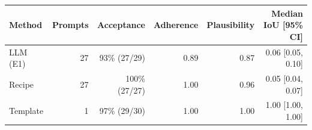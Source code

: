 \begin{tabular}{lrrrrr}
\toprule
Method & Prompts & Acceptance & Adherence & Plausibility & Median IoU [95\% CI] \\
\midrule
LLM (E1) & 27 & 93\% (27/29) & 0.89 & 0.87 & 0.06 [0.05, 0.10] \\
Recipe & 27 & 100\% (27/27) & 1.00 & 0.96 & 0.05 [0.04, 0.07] \\
Template & 1 & 97\% (29/30) & 1.00 & 1.00 & 1.00 [1.00, 1.00] \\
\bottomrule
\end{tabular}

